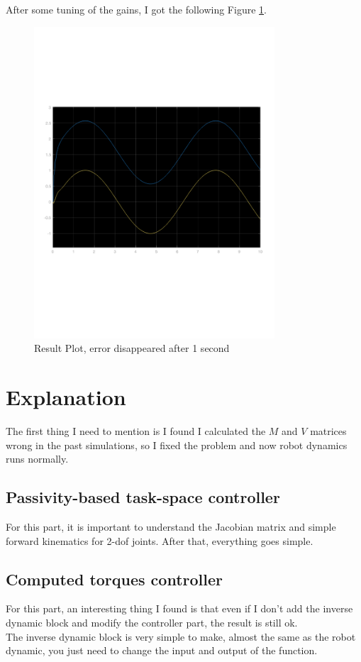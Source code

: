 \documentclass{article}
\begin{document}
After some tuning of the gains, I got the following Figure \ref{fig:result_computed_plot}. \\
\begin{figure}[ht]
    \centering
    \includegraphics[width=0.8\textwidth]{figures/result_computed.pdf}
    \caption{Result Plot, error disappeared after 1 second}
    \label{fig:result_computed_plot}
\end{figure}



\newpage

\section{Explanation}
The first thing I need to mention is I found I calculated the $M$ and $V$ matrices wrong in the past simulations, so I fixed the problem and now robot dynamics runs normally.\\

\subsection{Passivity-based task-space controller}
For this part, it is important to understand the Jacobian matrix and simple forward kinematics for 2-dof joints. After that, everything goes simple.\\ 


\subsection{Computed torques controller}
For this part, an interesting thing I found is that even if I don't add the inverse dynamic block and modify the controller part, the result is still ok.\\

The inverse dynamic block is very simple to make, almost the same as the robot dynamic, you just need to change the input and output of the function.
\end{document}
